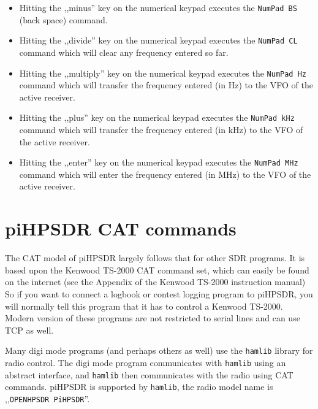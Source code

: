\documentclass[12pt]{book}
\def\rett#1{\texttt{\color{red}#1}}
\def\bltt#1{\texttt{\color{blue}#1}}
\def\pH{pi\-HPSDR\xspace}
\begin{document}
\begin{itemize}
\item[\rett{KP -}]{ Hitting the ,,minus'' key on the numerical keypad executes the
\bltt{NumPad BS} (back space) command.}

\item[\rett{KP /}]{ Hitting the ,,divide'' key on the numerical keypad executes the \bltt{NumPad CL}
command which will clear any frequency entered so far.}

\item[\rett{KP *}]{ Hitting the ,,multiply'' key on the numerical keypad executes the \bltt{NumPad Hz}
command which will transfer the frequency entered (in Hz) to the VFO of the active receiver.}

\item[\rett{KP +}]{ Hitting the ,,plus'' key on the numerical keypad executes the \bltt{NumPad kHz}
command which will transfer the frequency entered (in kHz) to the VFO of the active receiver.}

\item[\rett{KP enter}]{ Hitting the ,,enter'' key on the numerical keypad executes the \bltt{NumPad MHz}
command which will enter the frequency entered (in MHz) to the VFO of the active receiver.}
\end{itemize}

\chapter{\pH CAT commands}
\label{sec:catcommands}
The CAT model of \pH largely follows that for other SDR programs. It is based upon the Kenwood TS-2000
CAT command
set, which can easily be found on the internet (see the Appendix of the Kenwood TS-2000 instruction manual)
So if you want to connect a logbook
or contest logging program to \pH, you will normally tell this program that it has to control a Kenwood
TS-2000. Modern version of these programs are not restricted to serial lines and can use TCP as well.

Many digi mode programs (and perhaps others as well) use the \texttt{hamlib} library for radio control. The digi mode
program communicates with \texttt{hamlib} using an abstract interface, and \texttt{hamlib} then communicates with the radio
using CAT commands. \pH is supported by \texttt{hamlib}, the radio model name is ,,\texttt{OPENHPSDR PiHPSDR}''.
\end{document}
